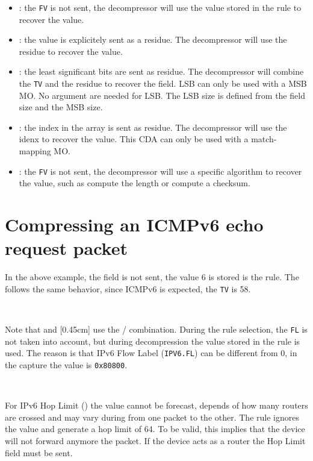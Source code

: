 \begin{itemize}
    \begin{itemize}
        \item {}: the \texttt{FV} is not sent, the decompressor will use the value stored in the rule to recover the value.
        \item {}: the value is explicitely sent as a residue. The decompressor will use the residue to recover the value.
        \item {}: the least significant bits are sent as residue. The decompressor will combine the \texttt{TV} and the residue to recover the field. LSB can only be used with a MSB MO. No argument are needed for LSB. The LSB size is defined from the field size and the MSB size.
        \item {} : the index in the array is sent as residue. The decompressor will use the idenx to recover the value. This CDA can only be used with a match-mapping MO.
        \item {}: the \texttt{FV} is not sent, the decompressor will use a specific algorithm to recover the value, such as compute the length or compute a checksum.
    \end{itemize}

\end{itemize}

\section{Compressing an ICMPv6 echo request packet}

In the above example, the  field is not sent, the value 6 is stored is the rule. 
The  follows the same behavior, since ICMPv6 is expected, the \texttt{TV} is 58.

~

Note that  and [0.45cm] use the / combination. During the rule selection, the \texttt{FL} is not taken into account, but during decompression the value stored in the rule is used. The reason is that IPv6 Flow Label (\texttt{IPV6.FL}) can be different from 0, in the capture the value is \texttt{0x80800}. 

~

For IPv6 Hop Limit  () the value cannot be forecast, depends of how many routers are crossed and may vary during from one packet to the other. The rule ignores the value and generate a hop limit of 64. To be valid, this implies that the device will not forward anymore the packet. If the device acts as a router the Hop Limit field must be sent.

